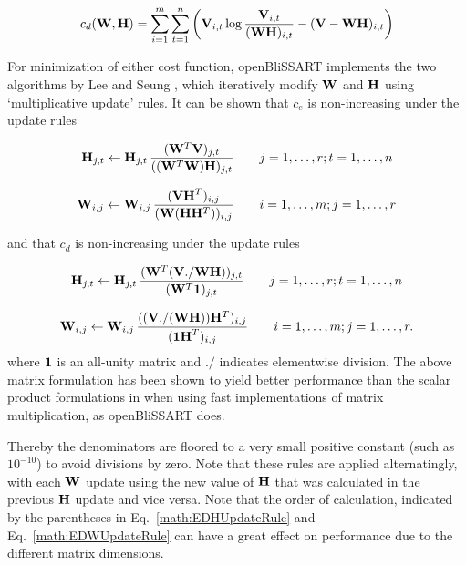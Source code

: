 \begin{equation}
    \label{math:kldiv}
    c_d(\mathbf{W},\mathbf{H}) = \sum\limits_{i=1}^m \sum\limits_{t=1}^n
    \left( \mathbf{V}_{i,t} \log\frac{\mathbf{V}_{i,t}}{(\mathbf{W}\mathbf{H})_{i,t}} - 
    (\mathbf{V} - \mathbf{W}\mathbf{H})_{i,t} \right)
\end{equation}

For minimization of either cost function, openBliSSART implements the two algorithms by
Lee and Seung \cite{LeeSeung2001}, which iteratively modify $\mathbf{W}$ and
$\mathbf{H}$ using `multiplicative update' rules. It can be shown that $c_e$ is
non-increasing under the update rules

\begin{equation}
    \label{math:EDHUpdateRule}
    \mathbf{H}_{j,t} \leftarrow \mathbf{H}_{j,t} \,
    \frac{( \mathbf{W}^T \mathbf{V} )_{j,t}}
         {( (\mathbf{W}^T \mathbf{W})\mathbf{H} )_{j,t}}
    \qquad
    j = 1, \dots, r; t = 1, \dots, n
\end{equation}

\begin{equation}
    \label{math:EDWUpdateRule}
    \mathbf{W}_{i,j} \leftarrow \mathbf{W}_{i,j} \,
    \frac{( \mathbf{VH}^T )_{i,j}}
         {( \mathbf{W} (\mathbf{H}\mathbf{H}^T) )_{i,j}}
    \qquad
     i = 1, \dots, m; j = 1, \dots, r
\end{equation}

\noindent and that $c_d$ is non-increasing under the update rules

\begin{equation}
    \label{math:KLHUpdateRule}
    \mathbf{H}_{j,t} \leftarrow \mathbf{H}_{j,t} \,
    \frac{(\mathbf{W}^T (\mathbf{V} ./ \mathbf{W}\mathbf{H}))_{j,t}}
         {(\mathbf{W}^T \mathbf{1})_{j,t}}
    \qquad
    j = 1, \dots, r; t = 1, \dots, n
\end{equation}

\begin{equation}
    \label{math:KLWUpdateRule}
    \mathbf{W}_{i,j} \leftarrow \mathbf{W}_{i,j} \,
    \frac{((\mathbf{V} ./ (\mathbf{WH})) \mathbf{H}^T)_{i,j}}
         {(\mathbf{1H}^T)_{i,j}}
    \qquad
     i = 1, \dots, m; j = 1, \dots, r .
\end{equation}
where $\mathbf{1}$ is an all-unity matrix and $./$ indicates elementwise division.
The above matrix formulation has been shown to yield better performance than
the scalar product formulations in \cite{LeeSeung2001} when using fast
implementations of matrix multiplication, as openBliSSART does.

Thereby the denominators are floored to a very small positive constant (such as
$10^{-10}$) to avoid divisions by zero. Note that these rules are applied
alternatingly, with each $\mathbf{W}$ update using the new value of $\mathbf{H}$ that
was calculated in the previous $\mathbf{H}$ update and vice versa. Note that the
order of calculation, indicated by the parentheses in
Eq.~\ref{math:EDHUpdateRule} and Eq.~\ref{math:EDWUpdateRule} can have a great
effect on performance due to the different matrix dimensions.


